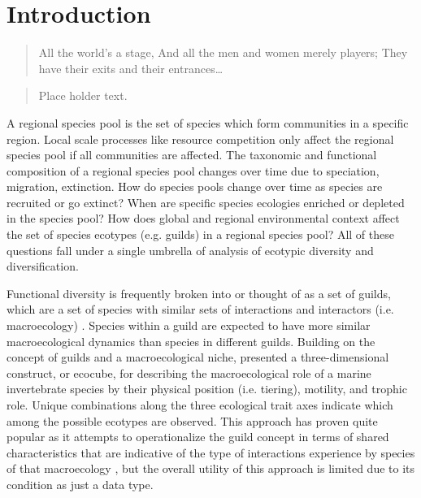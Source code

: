 \documentclass[12pt,letterpaper]{article}
\begin{document}
\section*{Introduction}

\begin{quotation}
  All the world's a stage, And all the men and women merely players; They have their exits and their entrances\dots
\end{quotation}

\begin{abstract}
  Place holder text.
\end{abstract}


A regional species pool is the set of species which form communities in a specific region. Local scale processes like resource competition only affect the regional species pool if all communities are affected. The taxonomic and functional composition of a regional species pool changes over time due to speciation, migration, extinction. How do species pools change over time as species are recruited or go extinct? When are specific species ecologies enriched or depleted in the species pool? How does global and regional environmental context affect the set of species ecotypes (e.g. guilds) in a regional species pool? All of these questions fall under a single umbrella of analysis of ecotypic diversity and diversification.

Functional diversity is frequently broken into or thought of as a set of guilds, which are a set of species with similar sets of interactions and interactors (i.e. macroecology) \citep{Valentine1969,Bambach1977,Brown1989,Simberloff1991a,Wilson1999}. Species within a guild are expected to have more similar macroecological dynamics than species in different guilds. Building on the concept of guilds and a macroecological niche, \citet{Bush2007} presented a three-dimensional construct, or ecocube, for describing the macroecological role of a marine invertebrate species by their physical position (i.e. tiering), motility, and trophic role. Unique combinations along the three ecological trait axes indicate which among the possible ecotypes are observed. This approach has proven quite popular as it attempts to operationalize the guild concept in terms of shared characteristics that are indicative of the type of interactions experience by species of that macroecology \citep{Bush2007,Bambach2007,Bush2011,Bush2012b,Novack-Gottshall2007,Villeger2011}, but the overall utility of this approach is limited due to its condition as just a data type.
\end{document}

